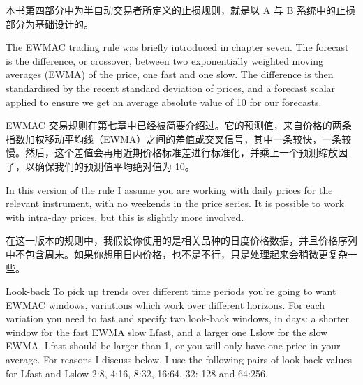 \begin{chineseblock}本书第四部分中为半自动交易者所定义的止损规则，就是以 A 与 B 系统中的止损部分为基础设计的。\end{chineseblock}


\begin{englishblock} The EWMAC trading rule was briefly introduced in chapter seven. The forecast is the difference, or crossover, between two exponentially weighted moving averages (EWMA) of the price, one fast and one slow. The difference is then standardised by the recent standard deviation of prices, and a forecast scalar applied to ensure we get an average absolute value of 10 for our forecasts. \end{englishblock}

\begin{chineseblock} EWMAC 交易规则在第七章中已经被简要介绍过。它的预测值，来自价格的两条指数加权移动平均线（EWMA）之间的差值或交叉信号，其中一条较快，一条较慢。然后，这个差值会再用近期价格标准差进行标准化，并乘上一个预测缩放因子，以确保我们的预测值平均绝对值为 10。 \end{chineseblock}

\bipairgap

\begin{englishblock} In this version of the rule I assume you are working with daily prices for the relevant instrument, with no weekends in the price series. It is possible to work with intra-day prices, but this is slightly more involved. \end{englishblock}

\begin{chineseblock}在这一版本的规则中，我假设你使用的是相关品种的日度价格数据，并且价格序列中不包含周末。如果你想用日内价格，也不是不行，只是处理起来会稍微更复杂一些。\end{chineseblock}

\bipairgap

\begin{englishblock} Look-back To pick up trends over different time periods you're going to want EWMAC windows, variations which work over different horizons. For each variation you need to fast and specify two look-back windows, in days: a shorter window for the fast EWMA slow Lfast, and a larger one Lslow for the slow EWMA. Lfast should be larger than 1, or you will only have one price in your average. For reasons I discuss below, I use the following pairs of look-back values for Lfast and Lslow 2:8, 4:16, 8:32, 16:64, 32: 128 and 64:256. \end{englishblock}

